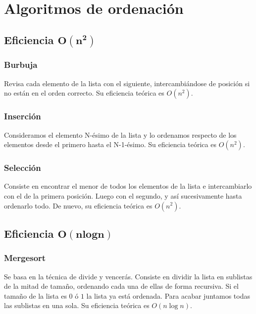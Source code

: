 \documentclass[11pt]{article}
\begin{document}
\begin{center}
	
\end{center}













\section*{Algoritmos de ordenación}
\subsection*{Eficiencia $\boldsymbol{O(n^2)}$}
\subsubsection*{Burbuja}
Revisa cada elemento de la lista con el siguiente, intercambiándose de posición
si no están en el orden correcto. Su eficiencia teórica es $O(n^2)$.

\newpage
\subsubsection*{Inserción}
Consideramos el elemento N-ésimo de la lista y lo ordenamos respecto de los elementos desde el primero hasta el N-1-ésimo. Su eficiencia teórica es $O(n^2)$.

\subsubsection*{Selección}
Consiste en encontrar el menor de todos los elementos de la lista e intercambiarlo con el de la primera posición. Luego con el segundo, y así sucesivamente hasta ordenarlo todo. De nuevo, su eficiencia teórica es $O(n^2)$.


\subsection*{Eficiencia $\boldsymbol{O(n log n)}$}
\subsubsection*{Mergesort}
Se basa en la técnica de divide y vencerás. Consiste en dividir la lista en sublistas de la mitad de tamaño, ordenando cada una de ellas de forma recursiva. Si el tamaño de la lista es $0$ ó $1$ la lista ya está ordenada. Para acabar juntamos todas las sublistas en una sola. Su eficiencia teórica es $O(n\log n)$.
\end{document}
